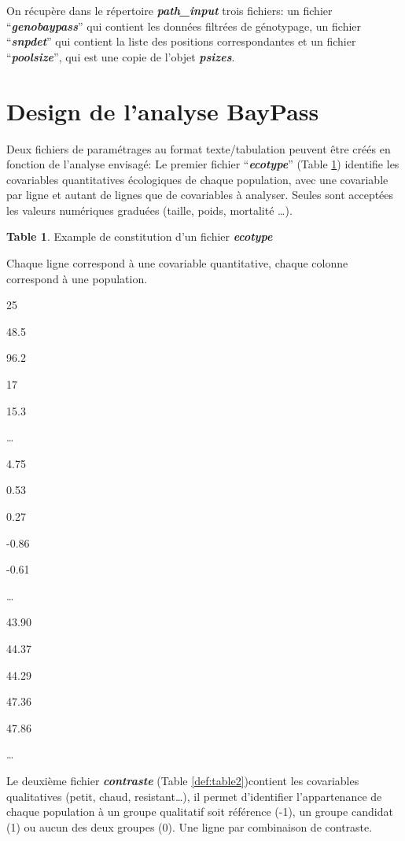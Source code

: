 \documentclass[
  openany]{book}
\theoremstyle{definition}
\newtheorem{definition}{Table}[chapter]
\theoremstyle{definition}
\theoremstyle{definition}
\theoremstyle{definition}
\theoremstyle{remark}
\begin{document}
On récupère dans le répertoire \textbf{\emph{path\_input}} trois fichiers: un fichier ``\textbf{\emph{genobaypass}}'' qui contient les données filtrées de génotypage, un fichier ``\textbf{\emph{snpdet}}'' qui contient la liste des positions correspondantes et un fichier ``\textbf{\emph{poolsize}}'', qui est une copie de l'objet \textbf{\emph{psizes}}.

\hypertarget{design-de-lanalyse-baypass}{%
\section*{Design de l'analyse BayPass}\label{design-de-lanalyse-baypass}}

Deux fichiers de paramétrages au format texte/tabulation peuvent être créés en fonction de l'analyse envisagé:
Le premier fichier ``\textbf{\emph{ecotype}}'' (Table \ref{def:table1}) identifie les covariables quantitatives écologiques de chaque population, avec une covariable par ligne et autant de lignes que de covariables à analyser. Seules sont acceptées les valeurs numériques graduées (taille, poids, mortalité \ldots).

\begin{definition}
\protect\hypertarget{def:table1}{}\label{def:table1}{Example de constitution d'un fichier \textbf{\emph{ecotype}}}
\end{definition}

Chaque ligne correspond à une covariable quantitative, chaque colonne correspond à une population.

25

48.5

96.2

17

15.3

\ldots{}

4.75

0.53

0.27

-0.86

-0.61

\ldots{}

43.90

44.37

44.29

47.36

47.86

\ldots{}

Le deuxième fichier \textbf{\emph{contraste}} (Table \ref{def:table2})contient les covariables qualitatives (petit, chaud, resistant\ldots), il permet d'identifier l'appartenance de chaque population à un groupe qualitatif soit référence (-1), un groupe candidat (1) ou aucun des deux groupes (0). Une ligne par combinaison de contraste.
\end{document}
